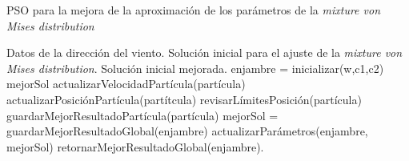 \begin{algorithm}[h!]
\caption{PSO para la mejora de la aproximación de los parámetros de la \emph{mixture von Mises distribution}}
\label{alg:pso_direction}
\begin{algorithmic}
\REQUIRE Datos de la dirección del viento.
\REQUIRE Solución inicial para el ajuste de la \emph{mixture von Mises distribution}.
\ENSURE Solución inicial mejorada.
\STATE enjambre = inicializar(w,c1,c2)
\STATE mejorSol
    \STATE actualizarVelocidadPartícula(partícula)
    \STATE actualizarPosiciónPartícula(partítcula)
    \STATE revisarLímitesPosición(partícula)
    \STATE guardarMejorResultadoPartícula(partícula)
\ENDFOR
\STATE mejorSol = guardarMejorResultadoGlobal(enjambre)
  \STATE actualizarParámetros(enjambre, mejorSol)
\ENDIF
\ENDFOR
\STATE retornarMejorResultadoGlobal(enjambre).
\end{algorithmic}
\end{algorithm}